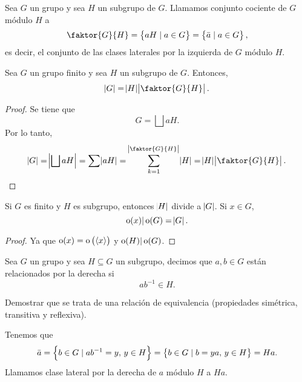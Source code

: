 \begin{defi}
    Sea $G$ un grupo y sea $H$ un subgrupo de $G$. Llamamos conjunto cociente de $G$ módulo $H$ a 
    \[
        \faktor{G}{H} = \setb{aH \mid a \in G} = \setb{ \bar{a} \mid a \in G},
    \]
    es decir, el conjunto de las clases laterales por la izquierda de $G$ módulo $H$.
    
\end{defi}

\begin{teo}\label{teo:lag}
    Sea $G$ un grupo finito y sea $H$ un subgrupo de $G$. Entonces,
    \[
        \abs{G} = \abs{H} \abs{\faktor{G}{H}}.
    \]
\end{teo}

\begin{proof}
    Se tiene que
    \[
        G = \bigsqcup aH.
    \]
    Por lo tanto,
    \[
        \abs{G} = \abs{\bigsqcup aH} = \sum \abs{aH} = \sum^{\abs{\faktor{G}{H}}}_{k = 1} \abs{H} = \abs{H} \abs{\faktor{G}{H}}.
    \]
\end{proof}

\begin{col}
    Si $G$ es finito y $H$ es subgrupo, entonces $\abs{H}$ divide a $\abs{G}$. Si $x \in G$,
    \[
        \operatorname{o}(x) \vert \operatorname{o}(G) = \abs{G}.
    \]
\end{col}

\begin{proof}
    Ya que $\operatorname{o}(x) = \operatorname{o}\left( \left< x \right> \right)$ y $\operatorname{o}(H) \vert \operatorname{o}(G)$.
\end{proof}

\begin{defi}
    Sea $G$ un grupo y sea $H \subseteq G$ un subgrupo, decimos que $a, b \in G$ están relacionados
    por la derecha si
    \[
        ab^{-1} \in H.
    \]
\end{defi}

\begin{ej}
    Demostrar que se trata de una relación de equivalencia (propiedades simétrica, transitiva y reflexiva).
\end{ej}

\begin{defi}
    Tenemos que
    \[
        \bar{a} = \left\{b \in G \mid ab^{-1} = y, \, y \in H\right\} = \left\{b \in G \mid b = ya, \, y \in H\right\} = Ha.
    \]
    Llamamos clase lateral por la derecha de $a$ módulo $H$ a $Ha$.
\end{defi}

